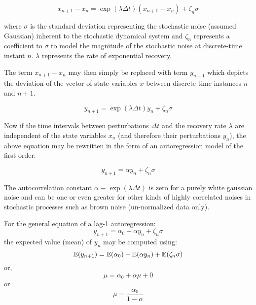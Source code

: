 \begin{equation}
	x_{n+1} - x_{n} = \exp{(\lambda \Delta t)}(x_{n+1}-x_{n}) + \zeta_n\sigma
\end{equation}

\hspace{25pt} where $\sigma$ is the standard deviation representing the stochastic noise (assumed Gaussian) inherent to the stochastic dynamical system and $\zeta_n$ represents a coefficient to $\sigma$ to model the magnitude of the stochastic noise at discrete-time instant $n$. $\lambda$ represents the rate of exponential recovery.

The term $x_{n+1} - x_{n}$ may then simply be replaced with term $y_{n+1}$ which depicts the deviation of the vector of state variables $x$ between discrete-time instances $n$ and $n+1$.

\begin{equation}
	y_{n+1} = \exp{(\lambda \Delta t)}y_n + \zeta_n
	\sigma
\end{equation}

Now if the time intervals between perturbations $\Delta t$ and the recovery rate $\lambda$ are independent of the state variables $x_{n}$ (and therefore their perturbations $y_{n}$), the above equation may be rewritten in the form of an autoregression model of the first order:

\begin{equation}
	\label{eq:autocorrNoConstant}
	y_{n+1} = \alpha y_{n} + \zeta_n\sigma
\end{equation}

The autocorrelation constant $\alpha \equiv \exp{(\lambda \Delta t)}$ is zero for a purely white gaussian noise and can be one or even greater for other kinds of highly correlated noises in stochastic processes such as brown noise (un-normalized data only).

For the general equation of a lag-1 autoregression:
\begin{equation}
	\label{eq:autocorrGeneral}
	y_{n+1} = \alpha_0 + \alpha y_{n} + \zeta_n\sigma
\end{equation} 
the expected value (mean) of $y_{n}$ may be computed using:
\begin{equation}
	\EX(y_{n+1}) = \EX(\alpha_0) + \EX(\alpha y_{n}) + \EX(\zeta_n \sigma)
\end{equation}
\hspace{25pt} or,
\begin{equation}
	\mu = \alpha_0 + \alpha\mu + 0
\end{equation}
\hspace{25pt} or
\begin{equation}
	\label{eq:meanFormulaGeneral}
	\mu = \frac{\alpha_0}{1-\alpha}
\end{equation}

